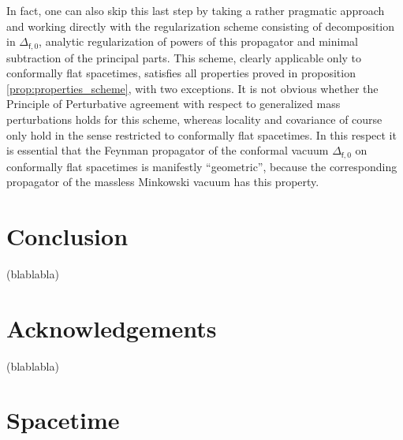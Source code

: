 \documentclass[11pt]{book}
\newcommand{\fsf}{\mathsf{f}}
\theoremstyle{break}
\begin{document}
In fact, one can also skip this last step by taking a rather pragmatic approach and working directly with the regularization scheme consisting of decomposition in $\Delta_{\fsf,0}$, analytic regularization of powers of this propagator and minimal subtraction of the principal parts. This scheme, clearly applicable only to conformally flat spacetimes, satisfies all properties proved in proposition \ref{prop:properties_scheme}, with two exceptions. It is not obvious whether the Principle of Perturbative agreement with respect to generalized mass perturbations holds for this scheme, whereas locality and covariance of course only hold in the sense restricted to conformally flat spacetimes. In this respect it is essential that the Feynman propagator of the conformal vacuum $\Delta_{\fsf,0}$ on conformally flat spacetimes is manifestly ``geometric'', because the corresponding propagator of the massless Minkowski vacuum has this property.



\chapter*{Conclusion}


(blablabla)


\newpage
\vspace*{100pt}
\thispagestyle{empty}
\chapter*{Acknowledgements}


(blablabla)



\setcounter{section}{0}
\appendix



\chapter{Spacetime}
\label{p:SPACETIME}
\end{document}
